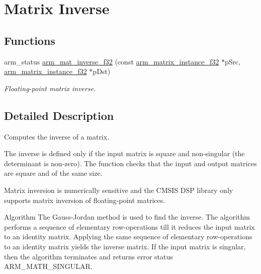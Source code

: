 \hypertarget{group___matrix_inv}{\section{Matrix Inverse}
\label{group___matrix_inv}
}
\subsection*{Functions}
\begin{DoxyCompactItemize}
\item 
arm\-\_\-status \hyperlink{group___matrix_inv_ga542be7aabbf7a2297a4b62cf212910e3}{arm\-\_\-mat\-\_\-inverse\-\_\-f32} (const \hyperlink{structarm__matrix__instance__f32}{arm\-\_\-matrix\-\_\-instance\-\_\-f32} $\ast$p\-Src, \hyperlink{structarm__matrix__instance__f32}{arm\-\_\-matrix\-\_\-instance\-\_\-f32} $\ast$p\-Dst)
\begin{DoxyCompactList}\small\item\em Floating-\/point matrix inverse. \end{DoxyCompactList}\end{DoxyCompactItemize}


\subsection{Detailed Description}
Computes the inverse of a matrix.

The inverse is defined only if the input matrix is square and non-\/singular (the determinant is non-\/zero). The function checks that the input and output matrices are square and of the same size.

Matrix inversion is numerically sensitive and the C\-M\-S\-I\-S D\-S\-P library only supports matrix inversion of floating-\/point matrices.

\begin{DoxyParagraph}{Algorithm }
The Gauss-\/\-Jordan method is used to find the inverse. The algorithm performs a sequence of elementary row-\/operations till it reduces the input matrix to an identity matrix. Applying the same sequence of elementary row-\/operations to an identity matrix yields the inverse matrix. If the input matrix is singular, then the algorithm terminates and returns error status {\ttfamily A\-R\-M\-\_\-\-M\-A\-T\-H\-\_\-\-S\-I\-N\-G\-U\-L\-A\-R}.  
\end{DoxyParagraph}


